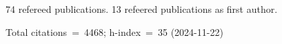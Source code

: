 74 refereed publications. 13 refeered publications as first author.

Total citations~=~4468; h-index~=~35 (2024-11-22)